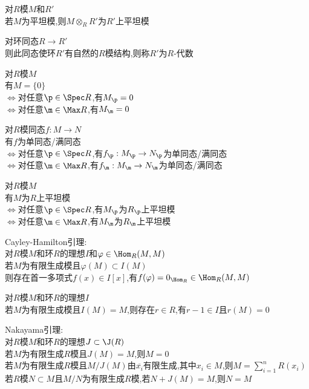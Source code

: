 \begin{dingli}
对$R$模$M$和$R'$\\
若$M$为平坦模,则$M\otimes_{R}R'$为$R'$上平坦模
\end{dingli}

\begin{dingyi}
对环同态$R\to R'$\\
则此同态使环$R'$有自然的$R$模结构,则称$R'$为$R$-代数
\end{dingyi}

\begin{dingli}
对$R$模$M$\\
有$M=\{0\}$\\
$\Leftrightarrow$对任意$\p\in \Spec R$,有$M_{\p}=0$\\
$\Leftrightarrow$对任意$\m\in \Max R$,有$M_{\m}=0$
\end{dingli}

\begin{dingli}
对$R$模同态$f:M\to N$\\
有$f$为单同态/满同态\\
$\Leftrightarrow$对任意$\p\in \Spec R$,有$f_{\p}:M_{\p}\to N_{\p}$为单同态/满同态\\
$\Leftrightarrow$对任意$\m\in \Max R$,有$f_{\m}:M_{\m}\to N_{\m}$为单同态/满同态
\end{dingli}

\begin{dingli}
对$R$模$M$\\
有$M$为$R$上平坦模\\
$\Leftrightarrow$对任意$\p\in \Spec R$,有$M_{\p}$为$R_{\p}$上平坦模\\
$\Leftrightarrow$对任意$\m\in \Max R$,有$M_{\m}$为$R_{\m}$上平坦模
\end{dingli}

\begin{dingli}
Cayley-Hamilton引理:\\
对$R$模$M$和环$R$的理想$I$和$\varphi\in\Hom_{R}(M,M)$\\
若$M$为有限生成模且$\varphi(M)\subset I(M)$\\
则存在首一多项式$f(x)\in I[x]$,有$f(\varphi)=0_{\Hom_{R}}\in \Hom_{R}(M,M)$
\end{dingli}

\begin{dingli}
对$R$模$M$和环$R$的理想$I$\\
若$M$为有限生成模且$I(M)=M$,则存在$r\in R$,有$r-1\in I$且$r(M)=0$
\end{dingli}

\begin{dingli}
Nakayama引理:\\
对$R$模$M$和环$R$的理想$J\subset \J(R)$\\
若$M$为有限生成$R$模且$J(M)=M$,则$M=0$\\
若$M$为有限生成$R$模且$M/J(M)$由$\overline{x_i}$有限生成,其中$x_i\in M$,则$M=\sum\limits_{i=1}^{n}R(x_i)$\\
若$R$模$N\subset M$且$M/N$为有限生成$R$模,若$N+J(M)=M$,则$N=M$
\end{dingli}

